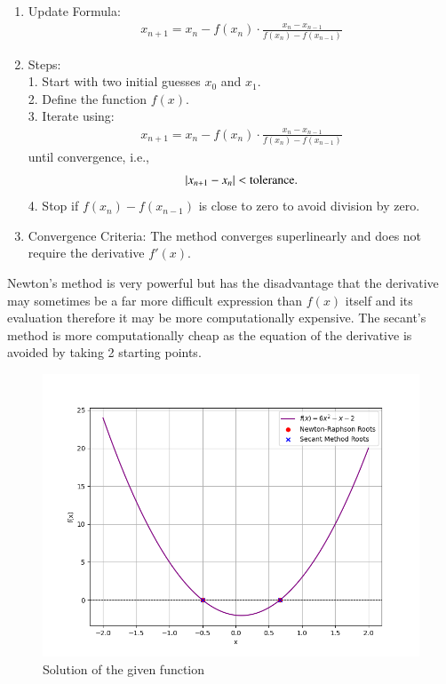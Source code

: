 \documentclass[journal]{IEEEtran}
\begin{document}
\begin{enumerate}
\item{Update Formula:}
\begin{align}
x_{n+1} = x_n - f(x_n) \cdot \frac{x_n - x_{n-1}}{f(x_n) - f(x_{n-1})}    
\end{align}


\item{Steps:}\\
1. Start with two initial guesses $x_0$  and $x_1$.\\
2. Define the function $f(x)$.\\
3. Iterate using:
   \begin{align}
   x_{n+1} = x_n - f(x_n) \cdot \frac{x_n - x_{n-1}}{f(x_n) - f(x_{n-1})}    
   \end{align}
   until convergence, i.e.,
   \begin{align}
   \left\vert x_{n+1} - x_n\right\vert < \text{tolerance}.
   \end{align}
4. Stop if $ f(x_n) - f(x_{n-1}) $ is close to zero to avoid division by zero.

\item{Convergence Criteria:}
The method converges superlinearly and does not require the derivative $ f'(x) $.


\end{enumerate}
Newton's method is very powerful but has the disadvantage that the derivative may sometimes be a far more difficult expression than \(f(x)\) itself and its evaluation therefore it may be more computationally expensive. The secant's method is more computationally cheap as the equation of the derivative is avoided by taking 2 starting points.\\ 
\begin{figure}[H]
		\centering
		\includegraphics[width=\columnwidth]{figs/Figure_1.png}
		\caption{Solution of the given function}
		\label{stemplot}
	\end{figure}
\end{document}
